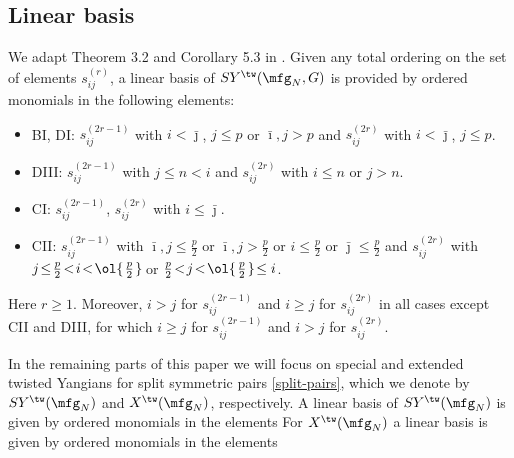 \documentclass{amsart}
\numberwithin{equation}{section}
\theoremstyle{remark}
\renewcommand{\,}{\kern 0.1em} %
\begin{document}

\subsection{Linear basis} \label{sec:basis}


We adapt Theorem 3.2 and Corollary 5.3 in \cite{GR16}. Given any total ordering on the set of elements $s_{ij}^{(r)}$, a linear basis of $SY^\tw(\mfg_N,G)$ is provided by ordered monomials in the following elements:

\begin{itemize}

\item BI, DI: $s_{ij}^{(2r-1)}$ with $i< \bar\jmath$, $j\le p$ or $\bar\imath,j>p$ and $s_{ij}^{(2r)}$ with $i< \bar\jmath$, $j\le p$. \vspace{0.2em}

\item DIII: \hspace{0.6em} $s_{ij}^{(2r-1)}$ with $j\le n < i$ and $s_{ij}^{(2r)}$ with $i\le n$ or $j> n$. \vspace{0.2em}

\item CI: \hspace{1.4em} $s_{ij}^{(2r-1)}$, $s_{ij}^{(2r)}$ with $i\le \bar\jmath$. \vspace{0.2em}

\item CII:\hspace{1.32em} $s_{ij}^{(2r-1)}$ with $\bar\imath, j\!\le\! \tfrac{p}{2}$ or $\bar\imath, j \!>\! \tfrac{p}{2}$ or $i\!\le\! \tfrac{p}{2}$ or $\bar\jmath \!\le\! \tfrac{p}{2}$ and 
$s_{ij}^{(2r)}$ with $j\!\le\! \tfrac{p}{2} \!<\! i \!< \!\ol{\,\tfrac{p}{2}\,}\!$ or $\tfrac{p}{2} \!<\! j \!< \!\ol{\,\tfrac{p}{2}\,}\! \le i$. 

\end{itemize}
%
Here $r\ge1$. Moreover, $i>j$ for $s^{(2r-1)}_{ij}$ and $i\ge j$ for $s_{ij}^{(2r)}$ in all cases except CII and DIII, for which $i\ge j$ for $s^{(2r-1)}_{ij}$ and $i> j$ for $s_{ij}^{(2r)}$.

\enlargethispage{0.5em}

In the remaining parts of this paper we will focus on special and extended twisted Yangians for split symmetric pairs \eqref{split-pairs}, which we denote by $SY^\tw(\mfg_N)$ and $X^\tw(\mfg_N)$, respectively. A linear basis of $SY^\tw(\mfg_N)$ is given by ordered monomials in the elements 
%
%
For $X^\tw(\mfg_N)$ a linear basis is given by ordered monomials in the elements 
%
\end{document}
